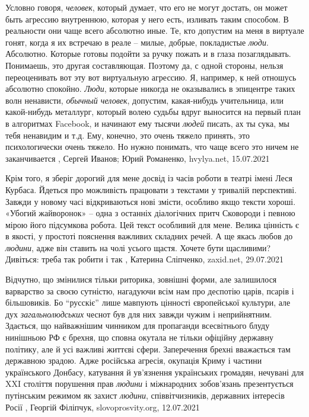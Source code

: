Условно говоря, \emph{человек}, который думает, что его не могут достать, он
может быть агрессию внутреннюю, которая у него есть, изливать таким способом. В
реальности они чаще всего абсолютно иные. Те, кто допустим на меня в виртуале
гонят, когда я их встречаю в реале – милые, добрые, покладистые \emph{люди}.
Абсолютно.  Которые готовы подойти за ручку пожать и в глаза позаглядывать.
Понимаешь, это другая составляющая. Поэтому да, с одной стороны, нельзя
переоценивать вот эту вот виртуальную агрессию. Я, например, к ней отношусь
абсолютно спокойно.  \emph{Люди}, которые никогда не оказывались в эпицентре
таких волн ненависти, \emph{обычный человек}, допустим, какая-нибудь учительница, или
какой-нибудь металлург, который волею судьбы вдруг выносится на первый план в
алгоритмах Facebook, и начинают ему тысячи \emph{людей} писать, ах ты сука, мы тебя
ненавидим и т.д. Ему, конечно, это очень тяжело принять, это психологически
очень тяжело. Но нужно понимать, что чаще всего это ничем не заканчивается
, 
Сергей Иванов; Юрий Романенко, hvylya.net, 15.07.2021

Крім того, я зберіг дорогий для мене досвід із часів роботи в театрі імені Леся
Курбаса. Йдеться про можливість працювати з текстами у тривалій перспективі.
Завжди у новому часі відкриваються нові змісти, особливо якщо тексти хороші.
«Убогий жайворонок» – одна з останніх діалогічних притч Сковороди і певною
мірою його підсумкова робота. Цей текст особливий для мене. Велика цінність є в
якості, у простоті пояснення важливих складних речей. А ще якась любов до
\emph{людини}, адже він ставить на чолі усього щастя. Хочете бути щасливими? Дивіться:
треба так робити і так
, 
Катерина Сліпченко, zaxid.net, 29.07.2021

Відчутно, що змінилися тільки риторика, зовнішні форми, але залишилося
варварство за своєю сутністю, нагадуючи всім нам про деспотію царів, псарів і
більшовиків. Бо \enquote{русскіє} лише мавпують цінності європейської культури, але дух
\emph{загальнолюдських} чеснот був для них завжди чужим і неприйнятним.  Здається, що
найважнішим чинником для пропаганди все­світнього блуду нинішньою РФ є брехня,
що сповна окутала не тільки офіційну державну політику, але й усі важливі
життєві сфери. Заперечення брехні вважається там державною зрадою. Адже
російська агресія, окупація Криму і частини українського Донбасу, катування й
ув’язнення українських громадян, нечувані для XXI століття порушення прав
\emph{людини} і міжнародних зобов’язань презентується путінським режимом як захист
\emph{людини}, співвітчизників, державних інтересів Росії
, Георгій Філіпчук, slovoprosvity.org, 12.07.2021

